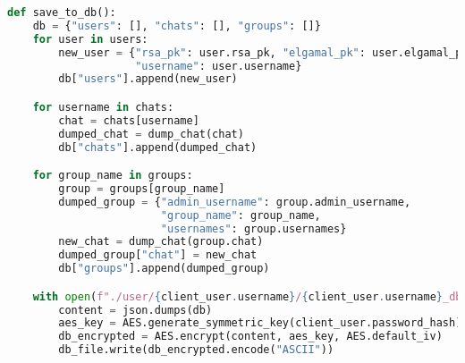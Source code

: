 \begin{latin}
\begin{lstlisting}[firstnumber=35, language=Python]
def save_to_db():
    db = {"users": [], "chats": [], "groups": []}
    for user in users:
        new_user = {"rsa_pk": user.rsa_pk, "elgamal_pk": user.elgamal_pk, "prekey_pk": user.prekey_pk,
                    "username": user.username}
        db["users"].append(new_user)

    for username in chats:
        chat = chats[username]
        dumped_chat = dump_chat(chat)
        db["chats"].append(dumped_chat)

    for group_name in groups:
        group = groups[group_name]
        dumped_group = {"admin_username": group.admin_username,
                        "group_name": group_name,
                        "usernames": group.usernames}
        new_chat = dump_chat(group.chat)
        dumped_group["chat"] = new_chat
        db["groups"].append(dumped_group)

    with open(f"./user/{client_user.username}/{client_user.username}_db.imal", 'wb') as db_file:
        content = json.dumps(db)
        aes_key = AES.generate_symmetric_key(client_user.password_hash)
        db_encrypted = AES.encrypt(content, aes_key, AES.default_iv)
        db_file.write(db_encrypted.encode("ASCII"))

\end{lstlisting}
\end{latin}

